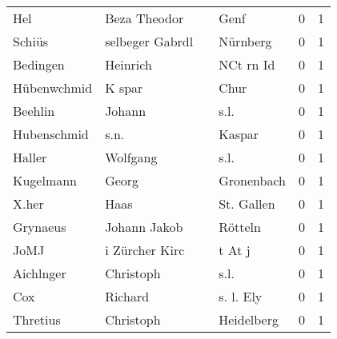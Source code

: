 \begin{center}
\begin{tiny}
\begin{longtabu}{llllrr}
                      Hel &                       Beza Theodor &             &                                        Genf &          0 &         1 \\
                   Schiüs &                    selbeger Gabrdl &             &                                    Nürnberg &          0 &         1 \\
                 Bedingen &                           Heinrich &             &                                   NCt rn Id &          0 &         1 \\
              Hübenwchmid &                             K spar &             &                                        Chur &          0 &         1 \\
                  Beehlin &                             Johann &             &                                        s.l. &          0 &         1 \\
              Hubenschmid &                               s.n. &             &                                      Kaspar &          0 &         1 \\
                   Haller &                           Wolfgang &             &                                        s.l. &          0 &         1 \\
                Kugelmann &                              Georg &             &                                  Gronenbach &          0 &         1 \\
                    X.her &                               Haas &             &                                  St. Gallen &          0 &         1 \\
                 Grynaeus &                       Johann Jakob &             &                                     Rötteln &          0 &         1 \\
                     JoMJ &                     i Zürcher Kirc &             &                                      t At j &          0 &         1 \\
                Aichlnger &                          Christoph &             &                                        s.l. &          0 &         1 \\
                      Cox &                            Richard &             &                                   s. l. Ely &          0 &         1 \\
                 Thretius &                          Christoph &             &                                  Heidelberg &          0 &         1 \\

\end{longtabu}
\end{tiny}
\end{center}

